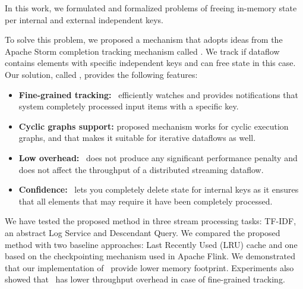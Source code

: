 \label {fs-acker-conclusion}

In this work, we formulated and formalized problems of freeing in-memory state per internal and external independent keys.

To solve this problem, we proposed a mechanism that adopts ideas from the Apache Storm completion tracking mechanism called \acker. We track if dataflow contains elements with specific independent keys and can free state in this case. Our solution, called \tracker, provides the following features:
\begin{itemize}
    \item {\bf Fine-grained tracking:} \tracker\ efficiently watches and provides notifications that system completely processed input items with a specific key.
    \item {\bf Cyclic graphs support:} proposed mechanism works for cyclic execution graphs, and that makes it suitable for iterative dataflows as well. 
    \item {\bf Low overhead:} \tracker\ does not produce any significant performance penalty and does not affect the throughput of a distributed streaming dataflow.
    \item {\bf Confidence:} \tracker\ lets you completely delete state for internal keys as it ensures that all elements that may require it have been completely processed.
\end{itemize}

We have tested the proposed method in three stream processing tasks: TF-IDF, an abstract Log Service and Descendant Query. We compared the proposed method with two baseline approaches: Last Recently Used (LRU) cache and one based on the checkpointing mechanism used in Apache Flink. We demonstrated that our implementation of \tracker\ provide lower memory footprint. Experiments also showed that \tracker\ has lower throughput overhead in case of fine-grained tracking.
